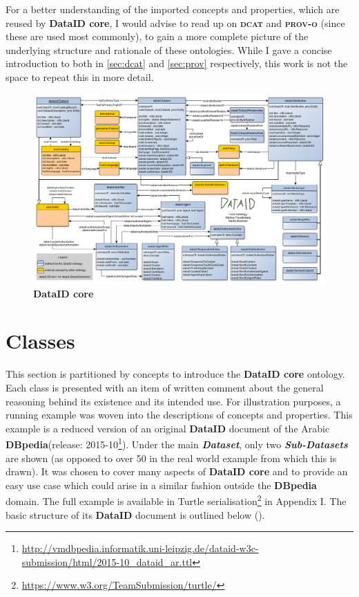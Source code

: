 \documentclass[a4paper,english,twoside,BCOR1.5cm,headsepline,DIV12,appendixprefix,final,12pt]{scrbook}
\newcommand{\dataid}{{\ttfamily\bfseries DataID}\xspace}
\newcommand{\core}{{\ttfamily\bfseries DataID core}\xspace}
\newcommand{\prov}{{\scshape\bfseries prov-o}\xspace}
\newcommand{\dcat}{{\scshape\bfseries dcat}\xspace}
\newcommand{\dbpedia}{{\ttfamily\bfseries DBpedia}\xspace}
\newcommand{\important}[1]{\textbf{\textit{#1}}}
\newcommand\footnoteurl[1]{\footnote{\scriptsize\url{#1}}}
\begin{document}
For a better understanding of the imported concepts and properties, which are reused by \core, I would advise to read up on \dcat \cite{ddcat} and \prov \cite{prov} (since these are used most commonly), to gain a more complete picture of the underlying structure and rationale of these ontologies. While I gave a concise introduction to both in \cref{sec:dcat} and \cref{sec:prov} respectively, this work is not the space to repeat this in more detail.

\begin{figure}
\centering
	\vspace*{-0.8cm}
  \includegraphics[angle=90, width=\textwidth]{images/DataIdOntology.png}
  \caption{\core}
  \label{fig:core}
\end{figure} 

\pagebreak
\section{Classes} 
\label{sec:coreclasses}

This section is partitioned by concepts to introduce the \core ontology. Each class is presented with an item of written comment about the general reasoning behind its existence and its intended use.
For illustration purposes, a running example was woven into the descriptions of concepts and properties. This example is a reduced version of an original \dataid document of the Arabic \dbpedia (release: 2015-10\footnoteurl{http://vmdbpedia.informatik.uni-leipzig.de/dataid-w3c-submission/html/2015-10_dataid_ar.ttl}). Under the main \important{Dataset}, only two \important{Sub-Datasets} are shown (as opposed to over 50 in the real world example from which this is drawn). It was chosen to cover many aspects of \core and to provide an easy use case which could arise in a similar fashion outside the \dbpedia domain. The full example is available in Turtle serialisation\footnoteurl{https://www.w3.org/TeamSubmission/turtle/} in Appendix I. The basic structure of its \dataid document is outlined below ().
\end{document}
